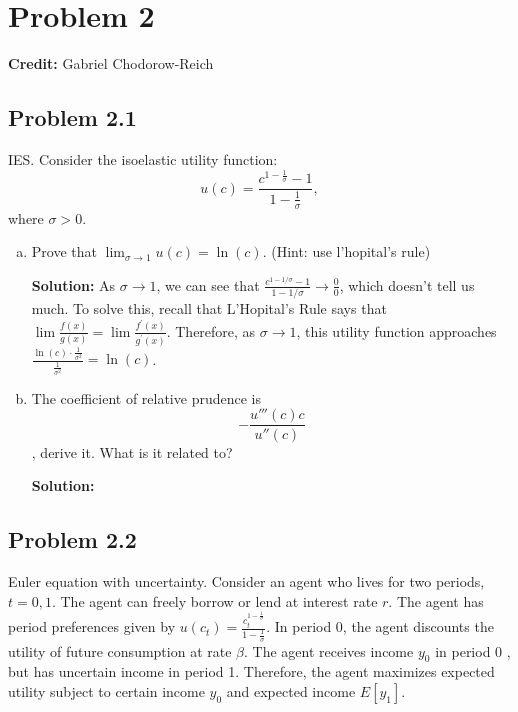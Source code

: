 \documentclass[11pt]{extarticle}
\theoremstyle{plain}
\theoremstyle{definition}
\begin{document}
\section*{Problem 2}

\textbf{Credit:} Gabriel Chodorow-Reich

\vspace{5mm}
\noindent

\subsection*{ Problem 2.1}
 IES. Consider the isoelastic utility function:
$$
u(c)=\frac{c^{1-\frac{1}{\sigma}}-1}{1-\frac{1}{\sigma}},
$$
where $\sigma>0$.

\begin{enumerate}[(a)]
\item Prove that  $\lim _{\sigma \rightarrow 1} u(c)=\ln (c)$. (Hint: use l'hopital's rule) 

\textbf{Solution:} As $\sigma \rightarrow 1$, we can see that $\frac{c^{1-1 / \sigma}-1}{1-1 / \sigma} \rightarrow \frac{0}{0}$, which doesn't tell us much. To solve this, recall that L'Hopital's Rule says that $\lim \frac{f(x)}{g(x)}=\lim \frac{f^{\prime}(x)}{g^{\prime}(x)}$. Therefore, as $\sigma \rightarrow 1$, this utility function approaches $\frac{\ln (c) \cdot \frac{1}{\sigma^2}}{\frac{1}{\sigma^2}}=\ln (c)$.

\item The coefficient of relative prudence is $$-\frac{u'''(c)c}{u''(c)}$$, derive it. What is it related to?

\textbf{Solution:}

\end{enumerate}

\subsection*{Problem 2.2}

Euler equation with uncertainty. Consider an agent who lives for two periods, $t=0,1$. The agent can freely borrow or lend at interest rate $r$. The agent has period preferences given by $u\left(c_t\right)=\frac{c_t^{1-\frac{1}{\sigma}}}{1-\frac{1}{\sigma}}$. In period 0, the agent discounts the utility of future consumption at rate $\beta$. The agent receives income $y_0$ in period 0 , but has uncertain income in period 1. Therefore, the agent maximizes expected utility subject to certain income $y_0$ and expected income $E\left[y_1\right]$.
\end{document}
